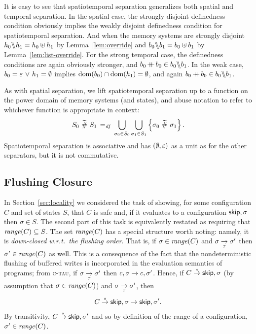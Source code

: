 \documentclass[11pt]{report}
\begin{document}
It is easy to see that spatiotemporal separation generalizes both spatial and temporal separation. In the spatial case, the strongly disjoint definedness condition obviously implies the weakly disjoint definedness condition for spatiotemporal separation. And when the memory systems are strongly disjoint $h_0 \backslash\!\!\backslash h_1 = h_0 \uplus h_1$ by Lemma~\ref{lem:override} and $b_0 \backslash\!\!\backslash b_1 = b_0 \uplus b_1$ by Lemma~\ref{lem:list-override}. For the strong temporal case, the definedness conditions are again obviously stronger, and $b_0 \operatorname{+\!\!\!+} b_0 \in b_0 \backslash\!\!\backslash b_1$. In the weak case, $b_0 = \varepsilon \operatorname{\,\vee\,} h_1 = \operatorname{\emptyset}$ implies $\operatorname{\mathrm{dom}}(b_0) \cap \operatorname{\mathrm{dom}}(h_1) = \operatorname{\emptyset}$, and again $b_0 \operatorname{+\!\!\!+} b_0 \in b_0 \backslash\!\!\backslash b_1$. 

As with spatial separation, we lift spatiotemporal separation up to a function on the power domain of memory systems (and states), and abuse notation to refer to whichever function is appropriate in context: \[ S_0 \operatorname{\,\widetilde{\#}\,} S_1 \operatorname{\;=_{\mathit{df}}\;} \bigcup_{\sigma_0 \in S_0} \bigcup_{\sigma_1 \in S_1} \left\lbrace \sigma_0 \operatorname{\,\widetilde{\#}\,} \sigma_1 \right\rbrace.\] Spatiotemporal separation is associative and has $(\operatorname{\emptyset},\varepsilon)$ as a unit as for the other separators, but it is not commutative. 


\subsection{Flushing Closure}
\label{sec:uniprocessor-predicates}

In Section~\ref{sec:locality} we considered the task of showing, for some configuration $C$ and set of states $S$, that $C$ is safe and, if it evaluates to a configuration $\operatorname{\mathsf{skip}},\sigma$ then $\sigma \in S$. The second part of this task is equivalently restated as requiring that $\mathit{range}(C) \subseteq S$. The set $\mathit{range}(C)$ has a special structure worth noting: namely, it is \emph{down-closed w.r.t.\ the flushing order}. That is, if $\sigma \in \mathit{range}(C)$ and $\sigma \underset{\tau}{\rightarrow} \sigma'$ then $\sigma' \in \mathit{range}(C)$ as well. This is a consequence of the fact that the nondeterministic flushing of buffered writes is incorporated in the evaluation semantics of programs; from \textsc{c-tau}, if $\sigma \underset{\tau}{\rightarrow} \sigma'$ then $c,\sigma \rightarrow c,\sigma'$. Hence, if $C \stackrel{\ast}{\rightarrow} \operatorname{\mathsf{skip}},\sigma$ (by assumption that $\sigma \in \mathit{range}(C)$) and $\sigma \underset{\tau}{\rightarrow} \sigma'$, then \[ C \stackrel{\ast}{\rightarrow} \operatorname{\mathsf{skip}},\sigma \rightarrow \operatorname{\mathsf{skip}},\sigma'.\] By transitivity, $C \stackrel{\ast}{\rightarrow} \operatorname{\mathsf{skip}},\sigma'$ and so by definition of the range of a configuration, $\sigma' \in \mathit{range}(C)$. 
  
\end{document}

